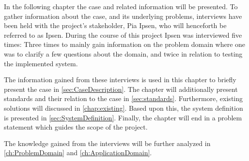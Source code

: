 In the following chapter the case and related information will be presented.
To gather information about the case, and its underlying problems, interviews have been held with the project's stakeholder, Pia Ipsen, who will henceforth be referred to as Ipsen.
During the course of this project Ipsen was interviewed five times:
Three times to mainly gain information on the problem domain where one was to clarify a few questions about the domain, and twice in relation to testing the implemented system.

The information gained from these interviews is used in this chapter to briefly present the case in \cref{sec:CaseDescription}.
The chapter will additionally present standards and their relation to the case in \cref{sec:standards}.
Furthermore, existing solutions will discussed in \cref{chap:existing}.
Based upon this, the system definition is presented in \cref{sec:SystemDefinition}.
Finally, the chapter will end in a problem statement which guides the scope of the project.

The knowledge gained from the interviews will be further analyzed in \cref{ch:ProblemDomain} and \cref{ch:ApplicationDomain}.
